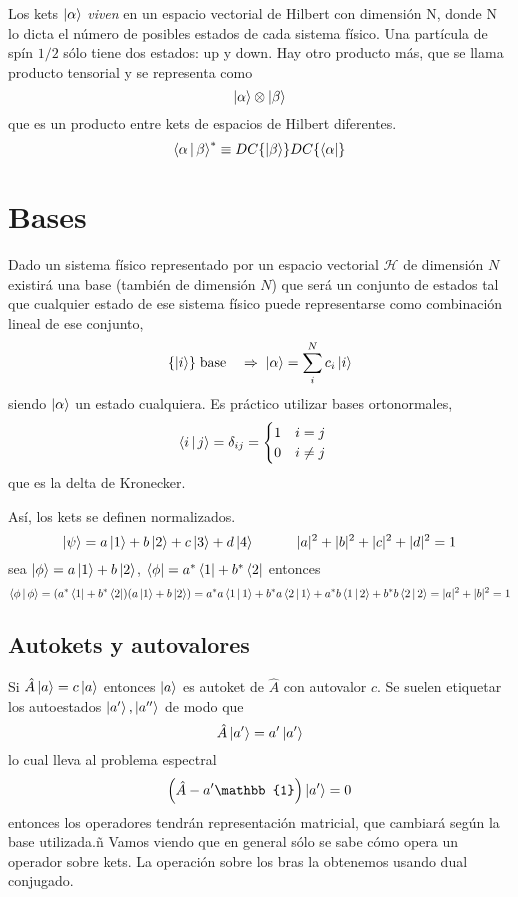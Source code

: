 \documentclass[10pt,oneside]{CBFT_book}
\begin{document}
Los kets $\Ket{\alpha}$ {\it viven} en un espacio vectorial de Hilbert con dimensión N, donde N lo dicta el número de 
posibles estados de cada sistema físico. Una partícula de spín $1/2$ sólo tiene dos estados: up y down.
Hay otro producto más, que se llama producto tensorial y se representa como 
\[
	\Ket{\alpha} \otimes \Ket{\beta}
\]
que es un producto entre kets de espacios de Hilbert diferentes.
\[
	\Braket{\alpha|\beta}^* \equiv DC\{\ket{\beta}\} DC\{\Bra{\alpha}\}
\]

\section{Bases}

Dado un sistema físico representado por un espacio vectorial $\mathcal{H}$ de dimensión $N$ existirá una base (también 
de dimensión $N$) que será un conjunto de estados tal que cualquier estado de ese sistema físico puede representarse 
como combinación lineal de ese conjunto,
\[
	\{ \Ket{i}\} \; \text{base} \quad \Rightarrow \; \Ket{\alpha} = \sum_i^N c_i \Ket{i}
\]
siendo $\Ket{\alpha}$ un estado cualquiera.
Es práctico utilizar bases ortonormales,
\[
	\Braket{ i|j } = \delta_{ij} = \begin{cases}
	                                1 \quad i=j \\
	                                0 \quad i\neq j
	                               \end{cases}
\]
que es la delta de Kronecker.

Así, los kets se definen normalizados.
\[
	\Ket{\psi} = a \Ket{1} + b \Ket{2} + c \Ket{3} + d \Ket{4} \qquad\quad |a|^2 + |b|^2 +|c|^2 +|d|^2 = 1
\]
sea $\Ket{\phi} = a \Ket{1} + b \Ket{2}$, $\Bra{\phi} = a^*\Bra{1} + b^* \Bra{2}$ entonces 
\[
	\Braket{\phi|\phi} = (a^*\Bra{1} + b^* \Bra{2})(a \Ket{1} + b \Ket{2}) = 
	a^*a \Braket{1|1} + b^*a\Braket{2|1} + a^*b\Braket{1|2} + b^*b\Braket{2|2} =
	|a|^2 + |b|^2 = 1
\]

\subsection{Autokets y autovalores}

Si $\hat{A}\Ket{a}=c\Ket{a}$ entonces $\Ket{a}$ es autoket de $\hat{A}$ con autovalor $c$. Se suelen 
etiquetar los autoestados $\Ket{a'}, \Ket{a''}$ de modo que 
\[
	\hat{A}\Ket{a'} = a'\Ket{a'}
\]
lo cual lleva al problema espectral
\[
	\left(\hat{A} - a'\mathbb{1}\right) \Ket{a'} = 0
\]
entonces los operadores tendrán representación matricial, que cambiará según la base utilizada.ñ
Vamos viendo que en general sólo se sabe cómo opera un operador sobre kets. La operación sobre los
bras la obtenemos usando dual conjugado.
\end{document}
